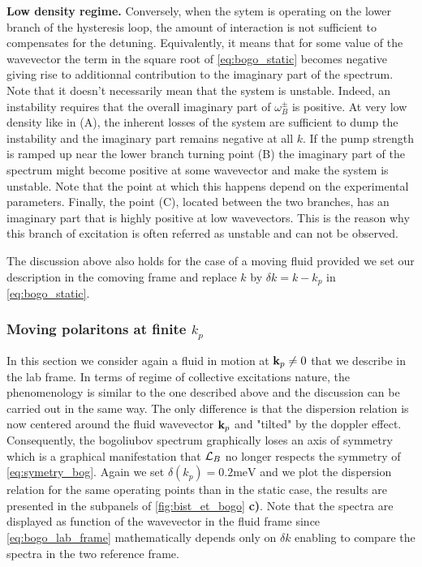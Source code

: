 \textbf{Low density regime.} Conversely, when the sytem is operating on the lower branch of the hysteresis loop, the amount of interaction is not sufficient to 
compensates for the detuning. Equivalently, it means that for some value of the wavevector the term in the square root of \autoref{eq:bogo_static} becomes negative
giving rise to additionnal contribution to the imaginary part of the spectrum. Note that it doesn't necessarily mean that the system is unstable. Indeed, an instability 
requires that the overall imaginary part of $\omega^{\pm}_B$ is positive. At very low density like in (A), the inherent losses of the system 
are sufficient to dump the instability and the imaginary part remains negative at all $k$. If the pump strength is ramped up near the lower branch turning point (B) 
the imaginary part of the spectrum might become positive at some wavevector and make the system is unstable. Note that the point at which this happens depend on the experimental
parameters. Finally, the point (C), located between the two branches, has an imaginary part that is highly positive at low wavevectors. This is the reason why this branch of excitation
is often referred as unstable and can not be observed. 


\bigskip 

The discussion above also holds for the case of a moving fluid provided we set our description in the comoving frame and replace $k$ by $\delta k=k-k_p$ in \autoref{eq:bogo_static}.

\subsubsection{Moving polaritons at finite $k_p$}
In this section we consider again a fluid in motion at $\mathbf{k}_p\neq0$ that we describe in the lab frame. In terms of regime of collective excitations nature, the phenomenology is similar to the one
described above and the discussion can be carried out in the same way. The only difference is that the dispersion relation is now centered around the fluid wavevector $\mathbf{k}_p$ and "tilted" by the doppler effect. Consequently, the bogoliubov spectrum graphically 
loses an axis of symmetry which is a graphical manifestation that $\mathcal{L}_B$ no longer respects the symmetry of \autoref{eq:symetry_bog}.
Again we set $\delta(k_p)=0.2 \mathrm{meV}$ and we plot the dispersion relation for the same operating points than in the static case, the results are presented in the subpanels of \autoref{fig:bist_et_bogo} \textbf{c)}. Note that the spectra are displayed as function 
of the wavevector in the fluid frame since \autoref{eq:bogo_lab_frame} mathematically depends only on $\delta k$ enabling to compare the spectra in the two reference frame.

